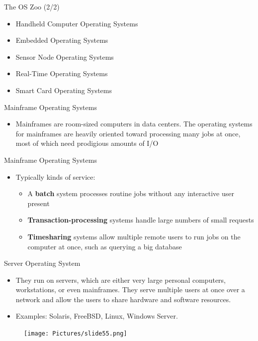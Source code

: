 \documentclass{beamer}
\begin{document}
\begin{frame}
{\centerline{The OS Zoo (2/2)}}
\begin{itemize}
    \item Handheld Computer Operating Systems
    \item Embedded Operating Systems
    \item Sensor Node Operating Systems
    \item Real-Time Operating Systems 
    \item Smart Card Operating Systems
\end{itemize}
\end{frame}


\begin{frame}
{\centerline{Mainframe Operating Systems}}
\begin{itemize}
    \item Mainframes are room-sized computers in data centers. The operating systems for mainframes are heavily oriented toward processing many jobs at once, most of which need prodigious amounts of I/O
\end{itemize}
\end{frame}


\begin{frame}
{\centerline{Mainframe Operating Systems}}
\begin{itemize}
    \item Typically kinds of service:
    \begin{itemize}
        \item A \textbf{batch }system processes routine jobs without any interactive user present
        \item \textbf{Transaction-processing }systems handle large numbers of small requests
        \item \textbf{Timesharing} systems allow multiple remote users to run jobs on the computer at once, such as querying a big database
    \end{itemize}
\end{itemize}
\end{frame}


\begin{frame}
{\centerline{Server Operating System}}
\begin{itemize}
    \item They run on servers, which are either very large personal computers, workstations, or even mainframes. They serve multiple users at once over a network and allow the users to share hardware and software resources.
    \item Examples: Solaris, FreeBSD, Linux, Windows Server.
\end{itemize}
\begin{figure}
    \centering
    \texttt{[image: Pictures/slide55.png]}
\end{figure}
\end{frame}
\end{document}
